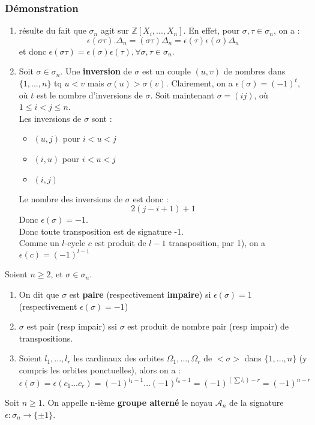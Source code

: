 \documentclass[a4paper, oneside]{report}
\theoremstyle{break}
\newcommand{\Z}{\mathbb{Z}}
\newcommand{\dem}{\subsubsection{Démonstration}}
\begin{document}
\dem
\begin{enumerate}
\item résulte du fait que $\sigma_n$ agit sur $\Z[X_i,...,X_n]$. En effet, pour $\sigma,\tau\in \sigma_n$, on a :
$$\epsilon(\sigma\tau).\Delta_n=(\sigma\tau)\Delta_n=\epsilon(\tau)\epsilon(\sigma)\Delta_n$$
et donc $\epsilon(\sigma\tau)=\epsilon(\sigma)\epsilon(\tau),\forall \sigma,\tau \in \sigma_n$.

\item Soit $\sigma\in \sigma_n$. Une \textbf{inversion} de $\sigma$ est un couple $(u,v)$ de nombres dans $\{1,...,n\}$ tq $u<v$ mais $\sigma(u)>\sigma(v)$. Clairement, on a $\epsilon(\sigma)=(-1)^t$, où $t$ est le nombre d'inversions de $\sigma$. Soit maintenant $\sigma=(ij)$, où $1\leq i < j \leq n$.\\
Les inversions de $\sigma$ sont :
\begin{itemize}
\item $(u,j)$ pour $i<u<j$
\item $(i,u)$ pour $i<u<j$
\item $(i,j)$
\end{itemize}
Le nombre des inversions de $\sigma$ est donc :
$$2(j-i+1)+1$$
Donc $\epsilon(\sigma)=-1$.\\
Donc toute transposition est de signature -1.\\
Comme un $l$-cycle $c$ est produit de $l-1$ transposition, par 1), on a $\epsilon(c)=(-1)^{l-1}$

\end{enumerate}

\remar
Soient $n\geq 2$, et $\sigma\in \sigma_n$.
\begin{enumerate}
\item On dit que $\sigma$ est \textbf{paire} (respectivement \textbf{impaire}) si $\epsilon(\sigma)=1$ (respectivement $\epsilon(\sigma)=-1$)
\item $\sigma$ est pair (resp impair) ssi $\sigma$ est produit de nombre pair (resp impair) de transpositions.
\item Soient $l_1,...,l_r$ les cardinaux des orbites $\Omega_1,...,\Omega_r$ de $<\sigma>$ dans $\{1,...,n\}$ (y compris les orbites ponctuelles), alors on a :
$$\epsilon(\sigma)=\epsilon(c_1...c_r)=(-1)^{l_1-1}...(-1)^{l_n-1}=(-1)^{(\sum l_i)-r}=(-1)^{n-r}$$
\end{enumerate}

Soit $n\geq 1$. On appelle n-ième \textbf{groupe alterné} le noyau $\mathcal{A}_n$ de la signature $\epsilon:\sigma_n\rightarrow \{\pm 1\}$.\\
\end{document}
